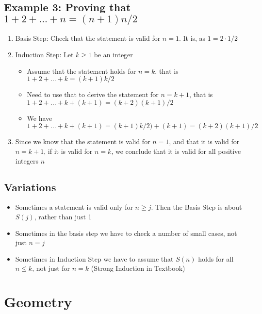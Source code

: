\documentclass{article}[18pt]
\begin{document}
\subsection{Example 3: Proving that $1+2+...+n=(n+1)n/2$}
\begin{enumerate}
\item Basis Step: Check that the statement is valid for $n=1$. It is, as $1=2\cdot1/2$
\item Induction Step: Let $k\geqslant1$ be an integer\begin{itemize}
\item Assume that the statement holds for $n=k$, that is\\ $1+2+...+k=(k+1)k/2$
\item Need to use that to derive the statement for $n=k+1$, that is\\ $1+2+...+k+(k+1)=(k+2)(k+1)/2$
\item We have\\ $1+2+...+k+(k+1)=(k+1)k/2)+(k+1)=(k+2)(k+1)/2$ 
\end{itemize}
\item Since we know that the statement is valid for $n=1$, and that it is valid for $n=k+1$, if it is valid for $n=k$, we conclude that it is valid for all positive integers $n$
\end{enumerate}

\subsection{Variations}
\begin{itemize}
\item Sometimes a statement is valid only for $n\geqslant j$. Then the Basis Step is about $S(j)$, rather than just 1
\item Sometimes in the basis step we have to check a number of small cases, not just $n=j$
\item Sometimes in Induction Step we have to assume that $S(n)$ holds for all $n\leqslant k$, not just for $n=k$ (Strong Induction in Textbook)
\end{itemize}
\section{Geometry}
\end{document}
